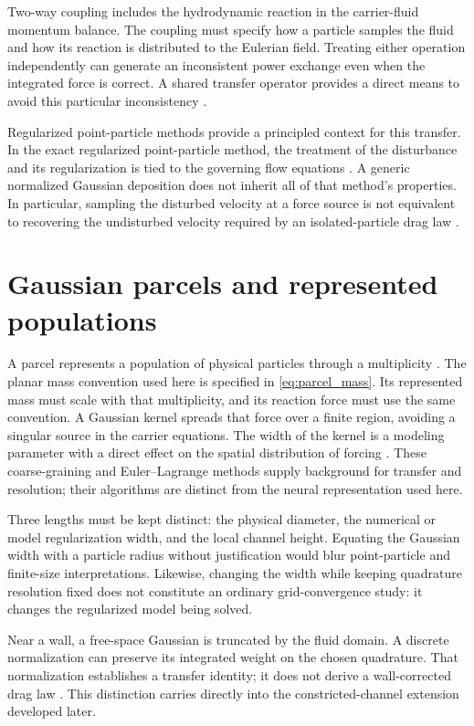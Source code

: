 Two-way coupling includes the hydrodynamic reaction in the carrier-fluid
momentum balance. The coupling must specify how a particle samples the fluid
and how its reaction is distributed to the Eulerian field. Treating either
operation independently can generate an inconsistent power exchange even
when the integrated force is correct. A shared transfer operator provides a
direct means to avoid this particular inconsistency \citep{peskin2002}. %

Regularized point-particle methods provide a principled context for this
transfer. In the exact regularized point-particle method, the treatment of
the disturbance and its regularization is tied to the governing flow
equations \citep{gualtieri2015}. A generic normalized Gaussian deposition
does not inherit all of that method's properties. In particular, sampling
the disturbed velocity at a force source is not equivalent to recovering
the undisturbed velocity required by an isolated-particle drag law
\citep{horwitz2016,ireland2017}. %

\section{Gaussian parcels and represented populations}
A parcel represents a population of physical particles through a
multiplicity \citep{subramaniam2013}. The planar mass convention used
here is specified in \cref{eq:parcel_mass}. %
 Its represented mass must scale with that multiplicity, and
its reaction force must use the same convention. A Gaussian kernel spreads
that force over a finite region, avoiding a singular source in the carrier
equations. The width of the kernel is a modeling parameter with a direct
effect on the spatial distribution of forcing
\citep{sun2015,capecelatro2013}. These coarse-graining and Euler--Lagrange
methods supply background for transfer and resolution; their algorithms
are distinct from the neural representation used here. %

Three lengths must be kept distinct: the physical diameter, the numerical
or model regularization width, and the local channel height. Equating the
Gaussian width with a particle radius without justification would blur
point-particle and finite-size interpretations. Likewise, changing the
width while keeping quadrature resolution fixed does not constitute an
ordinary grid-convergence study: it changes the regularized model being
solved.

Near a wall, a free-space Gaussian is truncated by the fluid domain. A
discrete normalization can preserve its integrated weight on the chosen
quadrature. That normalization establishes a transfer identity; it does
not derive a wall-corrected drag law \citep{goldman1967,brenner1961}. %
 This distinction carries directly into
the constricted-channel extension developed later.

